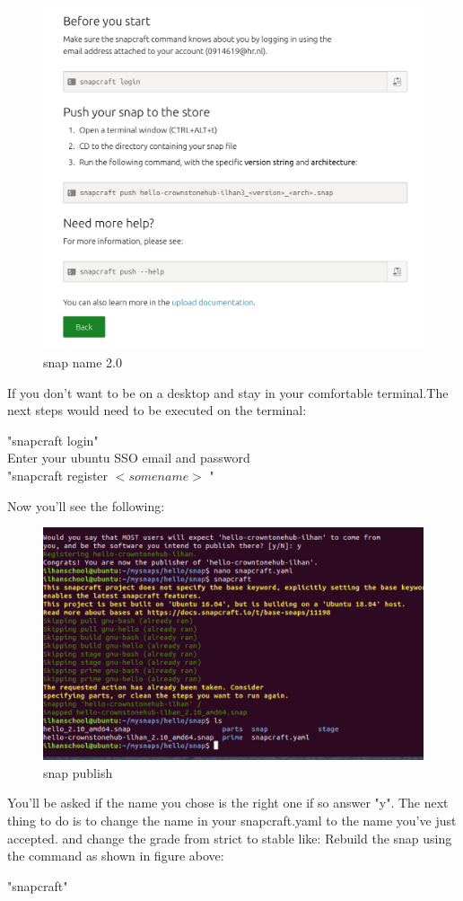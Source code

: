 \documentclass{article}
\begin{document}
\begin{flushleft}
\begin{flushleft}
\label{fig:step20}	
	\begin{figure}[H]
	\includegraphics[width=5in]{step20.png}
	\caption[Optional caption]{snap name 2.0}
	\end{figure}

If you don't want to be on a desktop and stay in your comfortable terminal.The next steps would need to be executed on the terminal:
			\begin{center}	
			"snapcraft login"\\
			Enter your ubuntu SSO email and password\\
			 "snapcraft register $<some name>$ "\\
			\end{center}
			\cleardoublepage
Now you'll see the following:
\label{fig:step15}	
	\begin{figure}[H]
	\includegraphics[width=5in]{step15.png}
	\caption[Optional caption]{snap publish}
	\end{figure}
You'll be asked if the name you chose is the right one if so answer  "y".	
The next thing to do is to change the name in your snapcraft.yaml to the name you've just accepted. and change the grade from strict to stable like: \pageref{fig:step13}
\bigskip
Rebuild the snap using the command as shown in figure above:
			\begin{center}	
			"snapcraft"\\ 
			\end{center}


\end{flushleft}
\end{flushleft}
\end{document}
